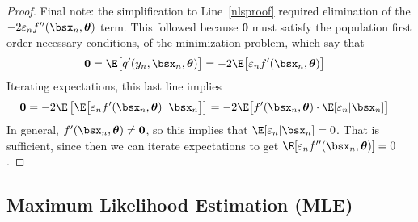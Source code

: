 \documentclass[12pt]{article}
\theoremstyle{plain}
\theoremstyle{definition}
\theoremstyle{remark}
\newcommand{\bstheta}{\boldsymbol{\theta}}
\renewcommand{\bso}{\boldsymbol{0}}
\begin{document}
\begin{proof}
Final note: the simplification to Line~\ref{nlsproof} required
elimination of the $-2\varepsilon_nf''(\bsx_n,\bstheta)$ term. This
followed because $\bstheta$ must satisfy the population first order
necessary conditions, of the minimization problem, which say that
\begin{align*}
  \bso =
  \E\big[q'(y_n,\bsx_n,\bstheta)\big]
  &=
  -2\E\big[\varepsilon_nf'(\bsx_n,\bstheta)\big]
\end{align*}
Iterating expectations, this last line implies
\begin{align*}
  \bso &=
  -2\E\left[
    \E\big[\varepsilon_nf'(\bsx_n,\bstheta)\;|\bsx_n\big]
  \right]
  =
  -2\E\big[
    f'(\bsx_n,\bstheta)\cdot \E[\varepsilon_n|\bsx_n]
  \big]
\end{align*}
In general, $f'(\bsx_n,\bstheta)\neq \bso$, so this implies that
$\E[\varepsilon_n|\bsx_n]=0$. That is sufficient, since then
we can iterate expectations to get
$\E[\varepsilon_nf''(\bsx_n,\bstheta)]=0$.
\end{proof}


\clearpage
\subsection{Maximum Likelihood Estimation (MLE)}
\label{sec:mle}
\end{document}
